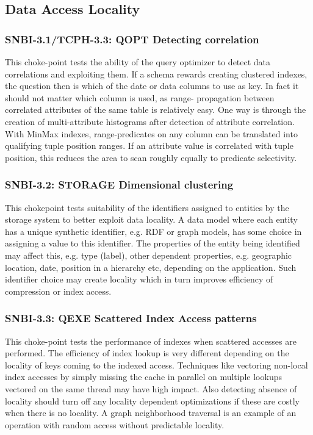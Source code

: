 \subsection{Data Access Locality}

\subsubsection{SNBI-3.1/TCPH-3.3: QOPT Detecting correlation}
\label{choke_point_3.1}
This choke-point tests the ability of the query optimizer to detect data correlations and exploiting them. If a schema rewards creating clustered indexes, the question then is which of the date or data columns to use as key. 
In fact it should not matter which column is used, as range- propagation between correlated attributes of the same table is relatively easy. One way is through the creation of multi-attribute histograms after detection of attribute correlation. 
With MinMax indexes, range-predicates on any column can be translated into qualifying tuple position ranges. If an attribute value is correlated with tuple position, this reduces the area to scan roughly equally to predicate selectivity.

\subsubsection{SNBI-3.2: STORAGE Dimensional clustering}
\label{choke_point_3.2}
This chokepoint tests suitability of the identifiers assigned to entities by the storage system to better exploit data locality. A data model where each entity has a unique synthetic identifier, 
e.g. RDF or graph models, has some choice in assigning a value to this identifier. The properties of the entity being identified may affect this, e.g. type (label), other dependent properties, 
e.g. geographic location, date, position in a hierarchy etc, depending on the application. Such identifier choice may create locality which in turn improves efficiency of compression or index access.

\subsubsection{SNBI-3.3: QEXE Scattered Index Access patterns}
\label{choke_point_3.3}
This choke-point tests the performance of indexes when scattered accesses are performed. The efficiency of index lookup is very different depending on the locality of keys coming to the indexed access. 
Techniques like vectoring non-local index accesses by simply missing the cache in parallel on multiple lookups vectored on the same thread may have high impact. 
Also detecting absence of locality should turn off any locality dependent optimizations if these are costly when there is no locality. A graph neighborhood traversal is an example of an operation with random access without predictable locality.

